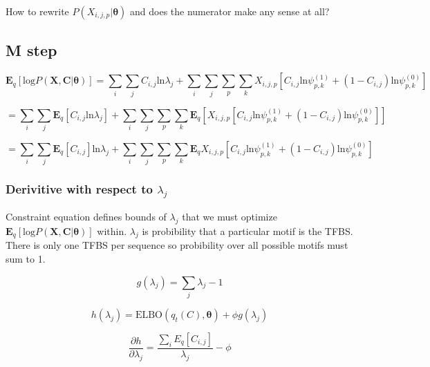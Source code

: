 \documentclass[12pt]{article}
\theoremstyle{definition}
\begin{document}
How to rewrite $P(X_{i,j,p} | \boldsymbol{\theta})$ and does the numerator make any sense at all?


\subsection{M step}

\begin{equation}
	\boldsymbol{E}_{q}[\textrm{log} P(\boldsymbol{X}, \boldsymbol{C} | \boldsymbol{\theta})] =  \sum_{i} \sum_{j} C_{i, j} \textrm{ln}\lambda_{j} + \sum_{i}\sum_{j}\sum_{p}\sum_{k} X_{i,j,p}[C_{i,j}\textrm{ln} \psi^{(1)}_{p, k} + (1 - C_{i,j})\textrm{ln}\psi^{(0)}_{p, k}]
\end{equation}

\begin{equation}
=  \sum_{i} \sum_{j} \boldsymbol{E}_{q} [C_{i, j} \textrm{ln}\lambda_{j}] + \sum_{i}\sum_{j}\sum_{p}\sum_{k} 	\boldsymbol{E}_{q}[X_{i,j,p}[C_{i,j}\textrm{ln} \psi^{(1)}_{p, k} + (1 - C_{i,j})\textrm{ln}\psi^{(0)}_{p, k}]]
\end{equation}

\begin{equation}
=  \sum_{i} \sum_{j} \boldsymbol{E}_{q}[C_{i, j}] \textrm{ln}\lambda_{j} + \sum_{i}\sum_{j}\sum_{p}\sum_{k} 	\boldsymbol{E}_{q}X_{i,j,p}[C_{i,j}\textrm{ln} \psi^{(1)}_{p, k} + (1 - C_{i,j})\textrm{ln}\psi^{(0)}_{p, k}]
\end{equation}

\subsubsection{Derivitive with respect to $\lambda_{j}$}

Constraint equation defines bounds of $\lambda_{j}$ that we must optimize $\boldsymbol{E}_{q}[\textrm{log} P(\boldsymbol{X}, \boldsymbol{C} | \boldsymbol{\theta})]$ within. $\lambda_{j}$ is probibility that a particular motif is the TFBS. There is only one TFBS per sequence so probibility over all possible motifs must sum to 1.

\begin{equation}
	g(\lambda_{j}) = \sum_{j} \lambda_{j} - 1
\end{equation}


\begin{equation}
	h(\lambda_{j}) = \textrm{ELBO}(q_{t}(C), \boldsymbol{\theta}) + \phi g(\lambda_{j})
\end{equation}

\begin{equation}
	\frac{\partial{h}}{\partial{\lambda_{j}}} = \frac{\sum_{i}{E}_{q}[C_{i, j}]}{\lambda_{j}} - \phi
\end{equation}
\end{document}

